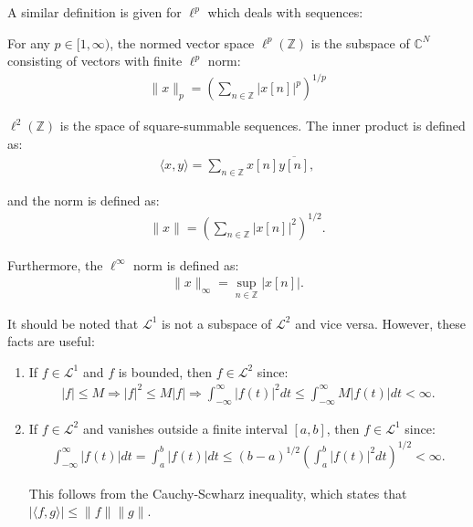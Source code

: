A similar definition is given for $\ell^p$ which deals with sequences:
\begin{definition}
For any $p \in [1,\infty)$, the normed vector space $\ell^p(\mathbb{Z})$ is the subspace of $\mathbb{C}^N$ consisting of vectors with finite $\ell^p$ norm:
\begin{align*}
\|x\|_p = \left( \sum_{n\in\mathbb{Z}} |x[n]|^p \right)^{1/p}
\end{align*}

$\ell^2(\mathbb{Z})$ is the space of square-summable sequences. The inner product is defined as:
\begin{align*}
\langle x,y \rangle = \sum_{n\in\mathbb{Z}} x[n] \overline{y[n]},
\end{align*}

and the norm is defined as:
\begin{align*}
\|x\| = \left( \sum_{n\in\mathbb{Z}} |x[n]|^2 \right)^{1/2}.
\end{align*}

Furthermore, the $\ell^\infty$ norm is defined as:
\begin{align*}
\|x\|_\infty = \sup_{n\in\mathbb{Z}}|x[n]|.
\end{align*}
\end{definition}

It should be noted that $\mathcal{L}^1$ is not a subspace of $\mathcal{L}^2$ and vice versa. However, these facts are useful:
\begin{enumerate}
\item If $f \in \mathcal{L}^1$ and $f$ is bounded, then $f \in \mathcal{L}^2$ since:
\begin{align*}
|f| \leq M \Rightarrow |f|^2 \leq M|f| \Rightarrow \int_{-\infty}^\infty |f(t)|^2 dt \leq \int_{-\infty}^\infty M|f(t)| dt < \infty.
\end{align*}

\item If $f \in \mathcal{L}^2$ and vanishes outside a finite interval $[a,b]$, then $f \in \mathcal{L}^1$ since:
\begin{align*}
\int_{-\infty}^\infty |f(t)| dt = \int_a^b |f(t)| dt \leq (b - a)^{1/2} \left( \int_a^b |f(t)|^2 dt \right)^{1/2} < \infty.
\end{align*}

This follows from the Cauchy-Scwharz inequality, which states that $|\langle f,g \rangle| \leq \|f\| \|g\|$.
\end{enumerate}